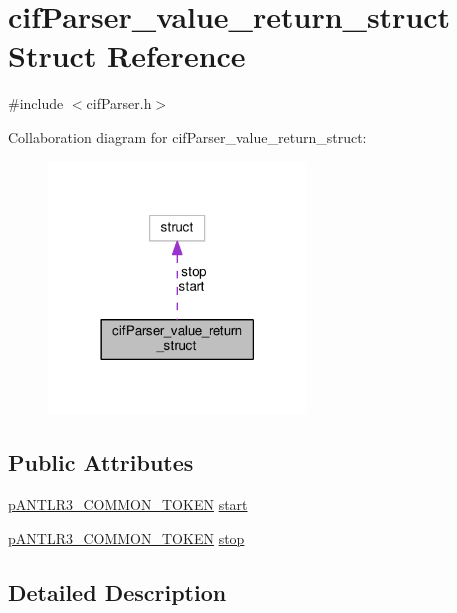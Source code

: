 \hypertarget{structcif_parser__value__return__struct}{\section{cif\-Parser\-\_\-value\-\_\-return\-\_\-struct Struct Reference}
\label{structcif_parser__value__return__struct}
}


{\ttfamily \#include $<$cif\-Parser.\-h$>$}



Collaboration diagram for cif\-Parser\-\_\-value\-\_\-return\-\_\-struct\-:
\nopagebreak
\begin{figure}[H]
\begin{center}
\leavevmode
\includegraphics[width=194pt]{structcif_parser__value__return__struct__coll__graph}
\end{center}
\end{figure}
\subsection*{Public Attributes}
\begin{DoxyCompactItemize}
\item 
\hyperlink{antlr3interfaces_8h_adaa6df9cbf0cd7ab37fd545520ff299b}{p\-A\-N\-T\-L\-R3\-\_\-\-C\-O\-M\-M\-O\-N\-\_\-\-T\-O\-K\-E\-N} \hyperlink{structcif_parser__value__return__struct_a40639b0c1d49ac7379d453f4d1a61f06}{start}
\item 
\hyperlink{antlr3interfaces_8h_adaa6df9cbf0cd7ab37fd545520ff299b}{p\-A\-N\-T\-L\-R3\-\_\-\-C\-O\-M\-M\-O\-N\-\_\-\-T\-O\-K\-E\-N} \hyperlink{structcif_parser__value__return__struct_a8c63d51e85f35e3652a4720af8a56240}{stop}
\end{DoxyCompactItemize}


\subsection{Detailed Description}


